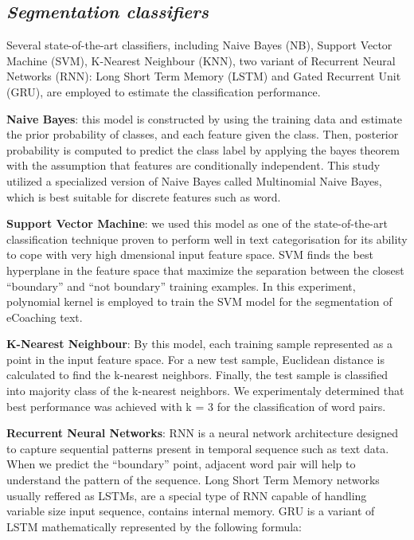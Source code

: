 \documentclass{amia}
\begin{document}
\subsection*{\textit{Segmentation classifiers}}
Several state-of-the-art classifiers, including Naive Bayes (NB)\cite{pedregosa2011scikit}, Support Vector Machine (SVM)\cite{chang2011libsvm}, K-Nearest Neighbour (KNN)\cite{pedregosa2011scikit}, two variant of Recurrent Neural Networks (RNN)\cite{bengio1993problem}: Long Short Term Memory (LSTM)\cite{hochreiter1997long} and Gated Recurrent Unit (GRU)\cite{cho2014properties}, are employed to estimate the classification performance. 

\textbf{Naive Bayes}: this model is constructed by using the training data and estimate the prior probability of classes, and each feature given the class. Then, posterior probability is computed to predict the class label by applying the bayes theorem with the assumption that features are conditionally independent. This study utilized a specialized version of Naive Bayes called Multinomial Naive Bayes, which is best suitable for discrete features such as word.

\textbf{Support Vector Machine}: we used this model as one of the state-of-the-art classification technique proven to perform well in text categorisation\cite{joachims1998text} for its ability to cope with very high dmensional input feature space. SVM finds the best hyperplane in the feature space that maximize the separation between the closest ``boundary'' and ``not boundary'' training examples. In this experiment, polynomial kernel is employed to train the SVM model for the segmentation of eCoaching text.   

\textbf{K-Nearest Neighbour}: By this model, each training sample represented as a point in the input feature space. For a new test sample, Euclidean distance is calculated to find the k-nearest neighbors. Finally, the test sample is classified into majority class of the k-nearest neighbors. We experimentaly determined that best performance was achieved with k = 3 for the classification of word pairs. 

\textbf{Recurrent Neural Networks}: RNN is a neural network architecture designed to capture sequential patterns present in temporal sequence such as text data. When we predict the ``boundary'' point, adjacent word pair will help to understand the pattern of the sequence. Long Short Term Memory networks usually reffered as LSTMs\cite{hochreiter1997long}, are a special type of RNN capable of handling variable size input sequence, contains internal memory. GRU\cite{cho2014properties} is a variant of LSTM mathematically represented by the following formula:
\end{document}
